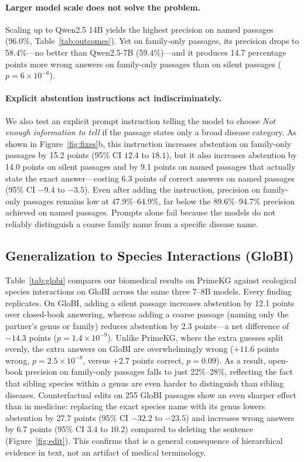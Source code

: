 \paragraph{Larger model scale does not solve the problem.}
Scaling up to Qwen2.5 14B yields the highest precision on named passages (96.0\%, Table~\ref{tab:outcomes}). Yet on family-only passages, its precision drops to 58.4\%—no better than Qwen2.5-7B (59.4\%)—and it produces 14.7 percentage points more wrong answers on family-only passages than on silent passages ($p = 6\times10^{-6}$).

\paragraph{Explicit abstention instructions act indiscriminately.}
We also test an explicit prompt instruction telling the model to choose \emph{Not enough information to tell} if the passage states only a broad disease category. As shown in Figure~\ref{fig:fixes}b, this instruction increases abstention on family-only passages by 15.2 points (95\% CI $12.4$ to $18.1$), but it also increases abstention by 14.0 points on silent passages and by 9.1 points on named passages that actually state the exact answer—costing 6.3 points of correct answers on named passages (95\% CI $-9.4$ to $-3.5$). Even after adding the instruction, precision on family-only passages remains low at 47.9\%--64.9\%, far below the 89.6\%--94.7\% precision achieved on named passages. Prompts alone fail because the models do not reliably distinguish a coarse family name from a specific disease name.

\subsection{Generalization to Species Interactions (GloBI)}



Table~\ref{tab:globi} compares our biomedical results on PrimeKG against ecological species interactions on GloBI across the same three 7--8B models. Every finding replicates. On GloBI, adding a silent passage increases abstention by 12.1 points over closed-book answering, whereas adding a coarse passage (naming only the partner's genus or family) reduces abstention by 2.3 points—a net difference of $-14.3$ points ($p = 1.4\times10^{-9}$). Unlike PrimeKG, where the extra guesses split evenly, the extra answers on GloBI are overwhelmingly wrong ($+11.6$ points wrong, $p = 2.5\times10^{-8}$, versus $+2.7$ points correct, $p = 0.09$). As a result, open-book precision on family-only passages falls to just 22\%--28\%, reflecting the fact that sibling species within a genus are even harder to distinguish than sibling diseases. Counterfactual edits on 255 GloBI passages show an even sharper effect than in medicine: replacing the exact species name with its genus lowers abstention by 27.7 points (95\% CI $-32.2$ to $-23.5$) and increases wrong answers by 6.7 points (95\% CI $3.4$ to $10.2$) compared to deleting the sentence (Figure~\ref{fig:edit}). This confirms that \clade{} is a general consequence of hierarchical evidence in text, not an artifact of medical terminology.

